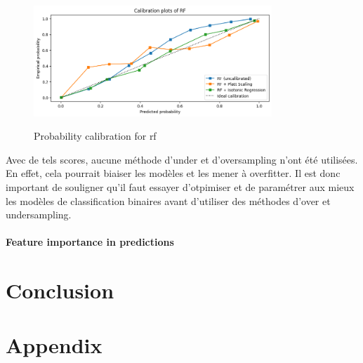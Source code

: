 \documentclass[12pt]{article}
\begin{document}
\FloatBarrier
\begin{figure}[h]
    \centering
    \includegraphics[width=0.8\textwidth]{Calibration_plot_RF.png}\\
    \caption{Probability calibration for \acrfull{rf}}
    \label{fig:Probability calibration for rf}
\end{figure}
\FloatBarrier

Avec de tels scores, aucune méthode d'under et d'oversampling n'ont été utilisées. En effet, cela pourrait biaiser les modèles et les mener à overfitter. Il est donc important de souligner qu'il faut essayer d'otpimiser et de paramétrer aux mieux les modèles de classification binaires avant d'utiliser des méthodes d'over et undersampling.

\paragraph{Feature importance in predictions}


\newpage
\section*{Conclusion}








\newpage
\section*{Appendix}
\end{document}
